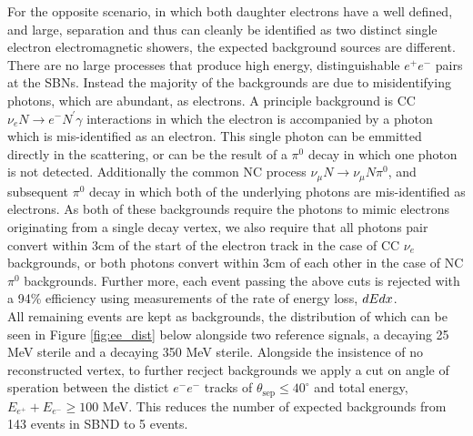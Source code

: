 \documentclass[11pt, a4paper]{article}
\begin{document}
For the opposite scenario, in which both daughter electrons have a well
defined, and large, separation and thus can cleanly be identified as two distinct single
electron electromagnetic showers, the expected background sources are different. There are no large processes that produce high energy, distinguishable $e^+e^-$ pairs at the SBNs. Instead the majority of the backgrounds are due to misidentifying photons, which are abundant, as electrons. A principle background is CC $\nu_e N \rightarrow e^- N^\prime \gamma$ interactions in which the electron is accompanied by a photon which is mis-identified as an electron. This single photon can be emmitted directly in the scattering, or can be the result of a $\pi^0$ decay in which one photon is not detected. Additionally the common NC  process $\nu_\mu N \rightarrow \nu_\mu N \pi^0$, and subsequent $\pi^0$ decay in which both of
the underlying photons are mis-identified as electrons. As both of these backgrounds require the photons to mimic electrons originating from a single decay vertex, we also require that all photons pair convert within 3cm of the start of the electron track in the case of CC $\nu_e$ backgrounds, or both photons convert within 3cm of each other in the case of NC $\pi^0$ backgrounds. Further more, each event passing the above cuts is rejected with a 94\% efficiency using measurements of the rate of energy loss, $dE\/dx$. \\

All remaining events are kept as backgrounds, the distribution of which can be seen in Figure \ref{fig:ee_dist} below alongside two reference signals, a decaying 25 MeV sterile and a decaying 350 MeV sterile. Alongside the insistence of no reconstructed vertex, to further recject backgrounds we apply a cut on angle of speration between the distict $e^-e^-$ tracks of $\theta_\text{sep}\leq 40 ^\circ$ and total energy, $E_{e^+}+E_{e^-} \geq 100$ MeV. This reduces the number of expected backgrounds from 143 events in SBND to 5 events. 
\end{document}
